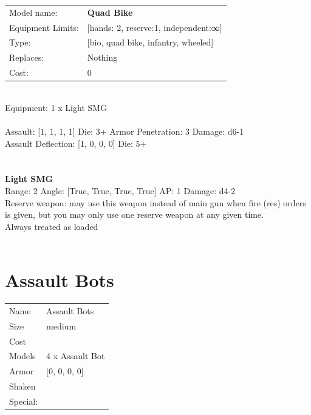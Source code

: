 \noindent
\begin{tabular}{ll}
Model name: &{\bf Quad Bike } \\
Equipment Limits: &[hands: 2, reserve:1, independent:∞] \\
Type: &[bio, quad bike, infantry, wheeled] \\
Replaces: &Nothing \\
Cost: & 0\\
\end{tabular}
\ \\
Equipment: 1 x Light SMG \\
\ \\
Assault: [1, 1, 1, 1] Die: 3+ Armor Penetration: 3 Damage: d6-1 \\
Assault Deflection: [1, 0, 0, 0] Die: 5+\\
\indent  
\ \\

\ \\
{\bf Light SMG } \\



Range: 2  Angle: [True, True, True, True] AP: 1 Damage: d4-2 \\
Reserve weapon: may use this weapon instead of main gun when fire (res) orders is given, but you may only use one reserve weapon at any given time.\\ 
Always treated as loaded\\ 




 
\ \\













\clearpage

\section{ Assault Bots }

\begin{tabular}{ll}
  Name & Assault Bots \\
  Size & medium\\
  Cost & \\
  Models & 4 x Assault Bot\\
  Armor & [0, 0, 0, 0]\\
  Shaken & \\
  Special: \\
\end{tabular}

